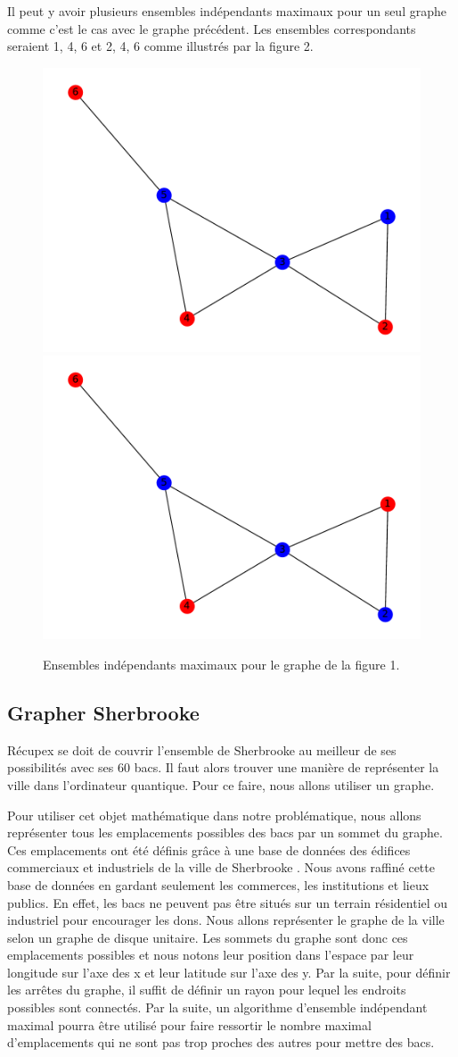 \documentclass[11pt]{article}
\begin{document}
Il peut y avoir plusieurs ensembles indépendants maximaux pour un seul graphe comme c'est le cas avec le graphe précédent. Les ensembles correspondants seraient {1, 4, 6} et {2, 4, 6} comme illustrés par la figure 2.

\begin{figure}[H]
    \centering
    \includegraphics[width=0.4\linewidth]{images/graphe_MIS_1.pdf}
    \includegraphics[width=0.4\linewidth]{images/graphe_MIS_2.pdf}
    \caption{Ensembles indépendants maximaux pour le graphe de la figure 1.}
    \label{MIS_exemple}
\end{figure}



\subsection{Grapher Sherbrooke}
Récupex se doit de couvrir l'ensemble de Sherbrooke au meilleur de ses possibilités avec ses 60 bacs. Il faut alors trouver une manière de représenter la ville dans l'ordinateur quantique. Pour ce faire,  nous allons utiliser un graphe. 

Pour utiliser cet objet mathématique dans notre problématique, nous allons représenter tous les emplacements possibles des bacs par un sommet du graphe. Ces emplacements ont été définis grâce à une base de données des édifices commerciaux et industriels de la ville de Sherbrooke \cite{noauthor_repertoire_nodate}. Nous avons raffiné cette base de données en gardant seulement les commerces, les institutions et lieux publics. En effet, les bacs ne peuvent pas être situés sur un terrain résidentiel ou industriel pour encourager les dons. Nous allons représenter le graphe de la ville selon un graphe de disque unitaire. Les sommets du graphe sont donc ces emplacements possibles et nous notons leur position dans l'espace par leur longitude sur l'axe des x et leur latitude sur l'axe des y. Par la suite, pour définir les arrêtes du graphe, il suffit de définir un rayon pour  lequel les endroits possibles sont connectés. Par la suite, un algorithme d'ensemble indépendant maximal pourra être utilisé pour faire ressortir le nombre maximal d'emplacements qui ne sont pas trop proches des autres pour mettre des bacs.
\end{document}
